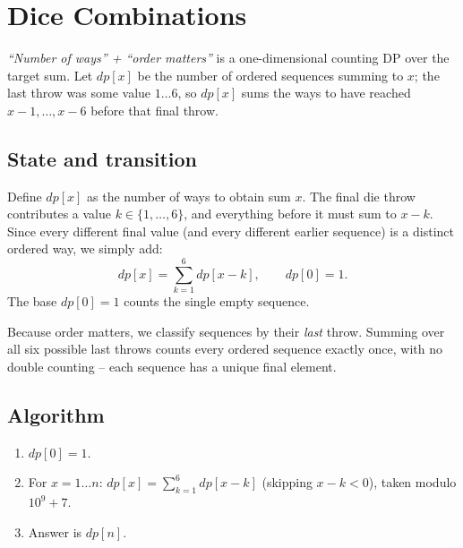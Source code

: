 \section{Dice Combinations}
\label{sec:cses-dice-combinations}


\begin{patternbox}
\emph{``Number of ways'' + ``order matters''} is a one-dimensional
counting DP over the target sum. Let $\textit{dp}[x]$ be the number of
ordered sequences summing to $x$; the last throw was some value
$1\ldots6$, so $\textit{dp}[x]$ sums the ways to have reached
$x-1,\ldots,x-6$ before that final throw.
\end{patternbox}

\subsection*{State and transition}

Define $\textit{dp}[x]$ as the number of ways to obtain sum $x$. The
final die throw contributes a value $k\in\{1,\ldots,6\}$, and everything
before it must sum to $x-k$. Since every different final value (and every
different earlier sequence) is a distinct ordered way, we simply add:
\[
  \textit{dp}[x]=\sum_{k=1}^{6}\textit{dp}[x-k],\qquad \textit{dp}[0]=1.
\]
The base $\textit{dp}[0]=1$ counts the single empty sequence.

\begin{ideabox}
Because order matters, we classify sequences by their \emph{last} throw.
Summing over all six possible last throws counts every ordered sequence
exactly once, with no double counting -- each sequence has a unique final
element.
\end{ideabox}

\subsection*{Algorithm}

\begin{enumerate}
  \item $\textit{dp}[0]=1$.
  \item For $x=1\ldots n$: $\textit{dp}[x]=\sum_{k=1}^{6}
        \textit{dp}[x-k]$ (skipping $x-k<0$), taken modulo $10^9+7$.
  \item Answer is $\textit{dp}[n]$.
\end{enumerate}


